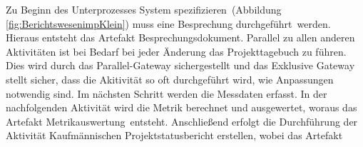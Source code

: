 Zu Beginn des Unterprozesses \grqq System spezifizieren\grqq \  (Abbildung \ref{fig:BerichtswesenimpKlein}) muss eine \grqq Besprechung durchgeführt\grqq \  werden. Hieraus entsteht das Artefakt \grqq Besprechungsdokument\grqq.\newline
Parallel zu allen anderen Aktivitäten ist bei Bedarf bei jeder Änderung das \grqq Projekttagebuch zu führen\grqq. Dies wird durch das Parallel-Gateway sichergestellt und das Exklusive Gateway stellt sicher, dass die Akitivität so oft durchgeführt wird, wie Anpassungen notwendig sind. \newline
Im nächsten Schritt werden die \grqq Messdaten erfasst\grqq.
In der nachfolgenden Aktivität wird die \grqq Metrik berechnet und ausgewertet\grqq, woraus das Artefakt \grqq Metrikauswertung\grqq \  entsteht.
Anschließend erfolgt die Durchführung der Aktivität \grqq Kaufmännischen Projektstatusbericht erstellen\grqq, wobei das Artefakt 
